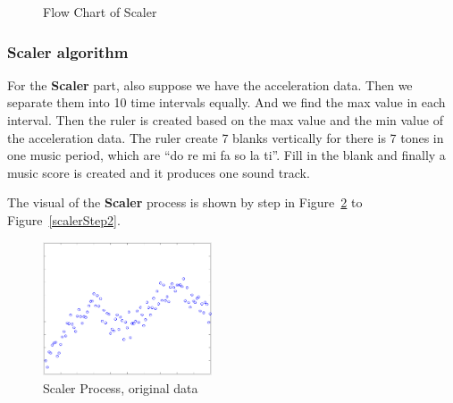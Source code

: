 \begin{figure}[H]
\begin{minipage}[b]{0.5\linewidth}
\caption{Flow Chart of Scaler}
\label{FlowMatcher}
\vspace{4ex}
\end{minipage}%
\end{figure}

\subsubsection{Scaler algorithm}

For the \textbf{Scaler} part, also suppose we have the acceleration data. Then
we separate them into 10 time intervals equally. And we find the max value in
each interval. Then the ruler is created based on the max value and the min
value of the acceleration data. The ruler create 7 blanks vertically for there
is 7 tones in one music period, which are ``do re mi fa so la ti''. Fill in the
blank and finally a music score is created and it produces one sound track. 

The visual of the \textbf{Scaler} process is shown by step in
Figure~\ref{scalerStep0} to Figure~\ref{scalerStep2}. 

\begin{figure}[H]
\centering
\newcommand{\widthOfScalerStepFigure}{5cm}
\includegraphics[width=\widthOfScalerStepFigure]{figWR/scaler0}
\caption{Scaler Process, original data}
\label{scalerStep0}
\end{figure}

